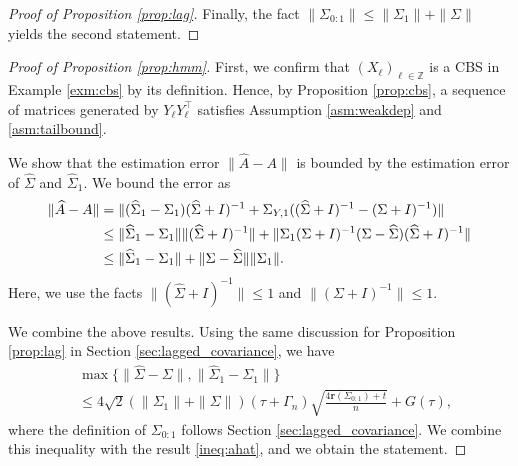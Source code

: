 \documentclass[11pt,a4paper]{article}
\theoremstyle{remark}
\theoremstyle{definition}
\theoremstyle{definition}
\renewcommand{\hat}{\widehat}
\begin{document}
\begin{bibunit}[apalike]
\begin{proof}[Proof of Proposition \ref{prop:lag}]
Finally, the fact $\left\|\Sigma_{0:1}\right\| \leq \|\Sigma_1\| + \|\Sigma\| $ yields the second statement.
\end{proof}



\begin{proof}[Proof of Proposition \ref{prop:hmm}]
First, we confirm that $(X_\ell)_{\ell \in \mathbb{Z}}$ is a CBS in Example \ref{exm:cbs} by its definition.
Hence, by Proposition \ref{prop:cbs}, a sequence of matrices generated by $Y_\ell Y_\ell^\top$ satisfies Assumption \ref{asm:weakdep} and \ref{asm:tailbound}.


We show that the estimation error $\|\hat{A} - A\|$ is bounded by the estimation error of $\hat{\Sigma}$ and $\hat{\Sigma}_1$.
We bound the error as
\begin{align}
    \|\hat{A} - A\| &= \| (\hat{\Sigma}_{1} - \Sigma_{1})  (\hat{\Sigma} +  I)^{-1} + \Sigma_{Y,1} ((\hat{\Sigma} +  I)^{-1} - ({\Sigma} +  I)^{-1})\| \notag \\
    & \leq \|\hat{\Sigma}_{1} - \Sigma_{1}\| \| (\hat{\Sigma} +  I)^{-1}\| + \| \Sigma_{1}({\Sigma} +  I)^{-1} ( \Sigma -  \hat{\Sigma}) (\hat{\Sigma} +  I)^{-1} \| \notag  \\
    & \leq \|\hat{\Sigma}_{1} - \Sigma_{1}\| +  \|\Sigma -  \hat{\Sigma}\| \|\Sigma_{1} \|. \label{ineq:ahat}
\end{align}
Here, we use the facts $\|(\hat{\Sigma} +  I)^{-1}\| \leq 1$ and $\|({\Sigma} +  I)^{-1}\| \leq 1$.


We combine the above results.
Using the same discussion for Proposition \ref{prop:lag} in Section \ref{sec:lagged_covariance}, we have %
\begin{align*}
    &\max\{\|\hat{\Sigma}-\Sigma\|, \| \hat{\Sigma}_1 - \Sigma_1\|\}\\    
    &\le 4\sqrt{2}\left(\|\Sigma_1\| + \|\Sigma\|\right) \left(\tau+\Gamma_{n}\right)\sqrt{\frac{4 \mathbf{r}\left(\Sigma_{0:1}\right)  +t}{n}} +  G(\tau),
\end{align*}
where the definition of $\Sigma_{0:1}$ follows Section \ref{sec:lagged_covariance}.
We combine this inequality with the result \eqref{ineq:ahat}, and we obtain the statement.
\end{proof}


\end{bibunit}
\end{document}

